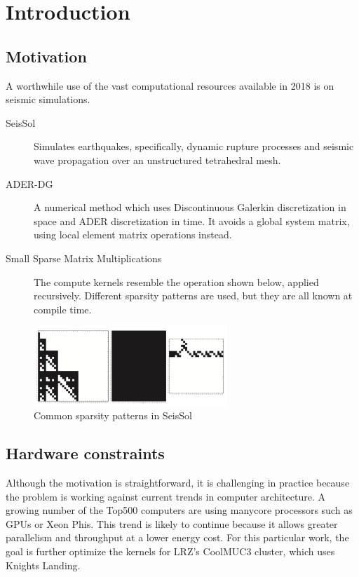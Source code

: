 \chapter{Introduction}
\label{chapter:Introduction}


\section{Motivation}

A worthwhile use of the vast computational resources available in 2018 is on seismic simulations. 

\begin{description}
	\item[SeisSol]
    Simulates earthquakes, specifically, dynamic rupture processes and seismic wave propagation over an unstructured tetrahedral mesh. 

    \item[ADER-DG]
    A numerical method which uses Discontinuous Galerkin discretization in space and ADER discretization in time. It avoids a global system matrix, using local element matrix operations instead.

    \item[Small Sparse Matrix Multiplications]
    The compute kernels resemble the operation shown below, applied recursively. Different sparsity patterns are used, but they are all known at compile time.
\end{description}

\begin{figure}
  \centering
  \includegraphics[height=3cm]{images/seissol_visc.png}
  \caption{Common sparsity patterns in SeisSol}
  \label{fig:seissol_star}
\end{figure}

\section{Hardware constraints}
\label{section:knl}

Although the motivation is straightforward, it is challenging in practice because the problem is working against current trends in computer architecture. A growing number of the Top500 computers are using manycore processors such as GPUs or Xeon Phis. This trend is likely to continue because it allows greater parallelism and throughput at a lower energy cost. For this particular work, the goal is further optimize the kernels for LRZ's CoolMUC3 cluster, which uses Knights Landing.

